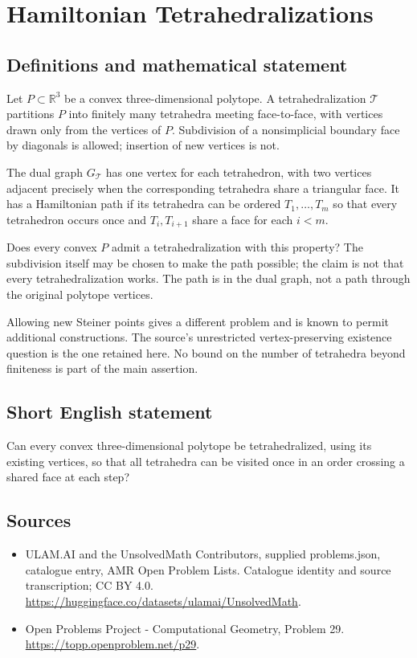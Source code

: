 \documentclass[11pt,a4paper]{article}
\begin{document}
\section*{Hamiltonian Tetrahedralizations}\label{statement}

\subsection{Definitions and mathematical statement}
Let $P\subset\mathbb R^3$ be a convex three-dimensional polytope. A
tetrahedralization $\mathcal T$ partitions $P$ into finitely many
tetrahedra meeting face-to-face, with vertices drawn only from the
vertices of $P$. Subdivision of a nonsimplicial boundary face by
diagonals is allowed; insertion of new vertices is not.

The dual graph $G_{\mathcal T}$ has one vertex for each tetrahedron,
with two vertices adjacent precisely when the corresponding
tetrahedra share a triangular face. It has a Hamiltonian path if its
tetrahedra can be ordered $T_1,\ldots,T_m$ so that every tetrahedron
occurs once and $T_i,T_{i+1}$ share a face for each $i<m$.

Does every convex $P$ admit a tetrahedralization with this property?
The subdivision itself may be chosen to make the path possible;
the claim is not that every tetrahedralization works. The path is
in the dual graph, not a path through the original polytope vertices.

Allowing new Steiner points gives a different problem and is known
to permit additional constructions. The source's unrestricted
vertex-preserving existence question is the one retained here.
No bound on the number of tetrahedra beyond finiteness is part of
the main assertion.
\subsection{Short English statement}
Can every convex three-dimensional polytope be tetrahedralized, using
its existing vertices, so that all tetrahedra can be visited once in
an order crossing a shared face at each step?
\subsection{Sources}
\begin{itemize}
\item[S1] ULAM.AI and the UnsolvedMath Contributors, supplied problems.json, catalogue entry, AMR Open Problem Lists. Catalogue identity and source transcription; CC BY 4.0.
\url{https://huggingface.co/datasets/ulamai/UnsolvedMath}.
\item[S2] Open Problems Project - Computational Geometry, Problem 29. 
\url{https://topp.openproblem.net/p29}.
\end{itemize}
\end{document}
